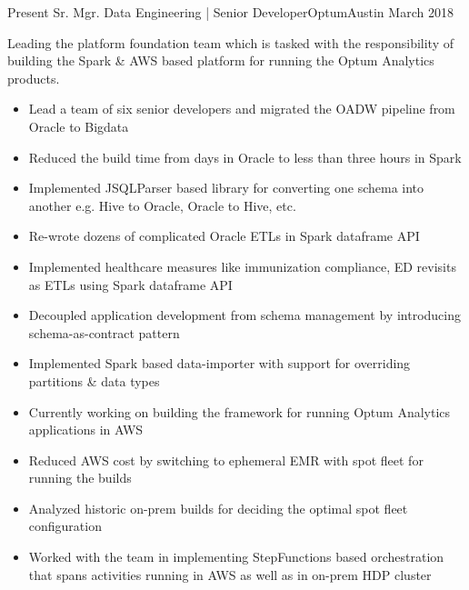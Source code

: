 %
%
%

\begin{experiences}
  \experience
    {Present}   {Sr. Mgr. Data Engineering | Senior Developer}{Optum}{Austin}
    {March 2018} {
    				  Leading the platform foundation team which is tasked with the responsibility of building the Spark \& AWS based platform for running the Optum Analytics products.
                      \begin{itemize}
                        \item Lead a team of six senior developers and migrated the OADW pipeline from Oracle to Bigdata
                       	\item Reduced the build time from days in Oracle to less than three hours in Spark
                       	\item Implemented JSQLParser based library for converting one schema into another e.g. Hive to Oracle, Oracle to Hive, etc.
                       	\item Re-wrote dozens of complicated Oracle ETLs in Spark dataframe API
                       	\item Implemented healthcare measures like immunization compliance, ED revisits as ETLs using Spark dataframe API
                       	\item Decoupled application development from schema management by introducing schema-as-contract pattern 
                       	\item Implemented Spark based data-importer with support for overriding partitions \& data types
                        \item Currently working on building the framework for running Optum Analytics applications in AWS  
                        \item Reduced AWS cost by switching to ephemeral EMR with spot fleet for running the builds 
                       	\item Analyzed historic on-prem builds for deciding the optimal spot fleet configuration
                       	\item Worked with the team in implementing StepFunctions based orchestration that spans activities running in AWS as well as in on-prem HDP cluster\\ 

\end{itemize}}
\end{experiences}
